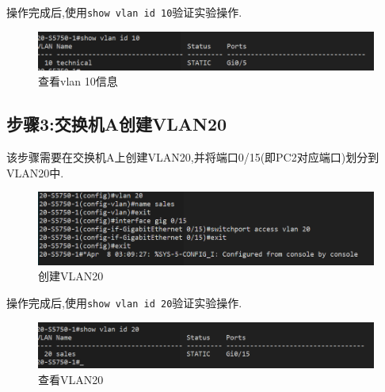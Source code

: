\documentclass{myreport}
\begin{document}
操作完成后,使用\texttt{show vlan id 10}验证实验操作.

\begin{figure}[htp]
    \centering
    \includegraphics[width=13cm]{"./figure/2018-05-17-17-03-09.png"}
    \caption{查看vlan 10信息}
    \label{fig:e2-s2-see-vlan10}
\end{figure}




\subsection{步骤3:交换机A创建VLAN20}

该步骤需要在交换机A上创建VLAN20,并将端口0/15(即PC2对应端口)划分到VLAN20中.

\begin{figure}[htp]
    \centering
    \includegraphics[width=13cm]{"./figure/2018-05-17-17-03-55.png"}
    \caption{创建VLAN20}
    \label{fig:e2-s3-vlan20}
\end{figure}



操作完成后,使用\texttt{show vlan id 20}验证实验操作.

\begin{figure}[htp]
    \centering
    \includegraphics[width=13cm]{"./figure/2018-05-17-17-04-27.png"}
    \caption{查看VLAN20}
    \label{fig:e2-s3-see-vlan20}
\end{figure}
\end{document}
